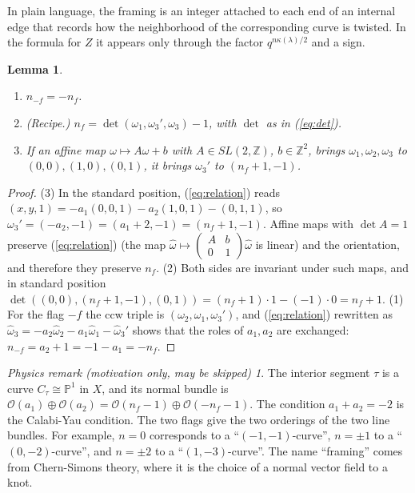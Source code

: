 \documentclass[11pt]{article}
\theoremstyle{plain}
\newtheorem{lemma}[theorem]{Lemma}
\theoremstyle{definition}
\theoremstyle{remark}
\newtheorem*{physrem}{Physics remark (motivation only, may be skipped)}
\newcommand{\Z}{\mathbb{Z}}
\newcommand{\PP}{\mathbb{P}}
\newcommand{\hatw}{\widehat{\omega}}
\begin{document}
In plain language, the framing is an integer attached to each end of an internal edge that
records how the neighborhood of the corresponding curve is twisted. In the formula for $Z$ it
appears only through the factor $q^{n\kappa(\lambda)/2}$ and a sign.

\begin{lemma}\label{lem:framingprops}
\begin{enumerate}
\item $n_{-f}=-n_f$.
\item (Recipe.) $n_f=\det(\omega_1,\omega_3',\omega_3)-1$, with $\det$ as in (\ref{eq:det}).
\item If an affine map $\omega\mapsto A\omega+b$ with $A\in SL(2,\Z)$, $b\in\Z^2$, brings
$\omega_1,\omega_2,\omega_3$ to $(0,0),(1,0),(0,1)$, it brings $\omega_3'$ to $(n_f+1,-1)$.
\end{enumerate}
\end{lemma}
\begin{proof}
(3) In the standard position, (\ref{eq:relation}) reads $(x,y,1)=-a_1(0,0,1)-a_2(1,0,1)-(0,1,1)$,
so $\omega_3'=(-a_2,-1)=(a_1+2,-1)=(n_f+1,-1)$. Affine maps with $\det A=1$ preserve
(\ref{eq:relation}) (the map $\hatw\mapsto\left(\begin{smallmatrix}A&b\\0&1\end{smallmatrix}\right)\hatw$
is linear) and the orientation, and therefore they preserve $n_f$.
(2) Both sides are invariant under such maps, and in standard position
$\det((0,0),(n_f+1,-1),(0,1))=(n_f+1)\cdot1-(-1)\cdot0=n_f+1$.
(1) For the flag $-f$ the ccw triple is $(\omega_2,\omega_1,\omega_3')$, and (\ref{eq:relation})
rewritten as $\hatw_3=-a_2\hatw_2-a_1\hatw_1-\hatw_3'$ shows that the roles of $a_1,a_2$ are
exchanged: $n_{-f}=a_2+1=-1-a_1=-n_f$.
\end{proof}

\begin{physrem}
The interior segment $\tau$ is a curve $C_\tau\cong\PP^1$ in $X$, and its normal bundle is
$\mathcal O(a_1)\oplus\mathcal O(a_2)=\mathcal O(n_f-1)\oplus\mathcal O(-n_f-1)$. The condition
$a_1+a_2=-2$ is the Calabi-Yau condition. The two flags give the two orderings of the two line
bundles. For example, $n=0$ corresponds to a ``$(-1,-1)$-curve'', $n=\pm1$ to a
``$(0,-2)$-curve'', and $n=\pm2$ to a ``$(1,-3)$-curve''. The name ``framing'' comes from Chern-Simons theory, where it is the choice
of a normal vector field to a knot.
\end{physrem}
\end{document}
